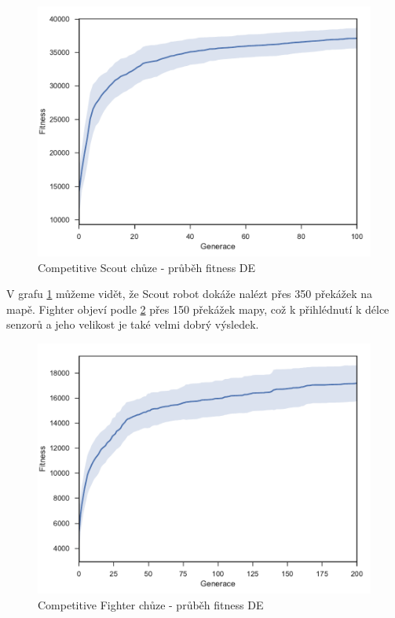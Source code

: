 \begin{figure}[t]\centering
	\includegraphics[width=0.75\columnwidth]{../img/CompetitiveMap/ScoutWalk}
	\caption{Competitive Scout chůze - průběh fitness DE}
	\label{obr04:CompetitiveScoutWalk}
\end{figure}
V grafu \ref{obr04:CompetitiveScoutWalk} můžeme vidět, že Scout robot dokáže nalézt přes 350 překážek na mapě. Fighter objeví podle \ref{obr04:CompetitiveFighterWalk}  přes 150 překážek mapy, což k přihlédnutí k délce senzorů a jeho velikost je také velmi dobrý výsledek.  
\begin{figure}[h]\centering
	\includegraphics[width=0.75\columnwidth]{../img/CompetitiveMap/FighterWalk}
	\caption{Competitive Fighter chůze - průběh fitness DE}
	\label{obr04:CompetitiveFighterWalk}
\end{figure}
\newpage
